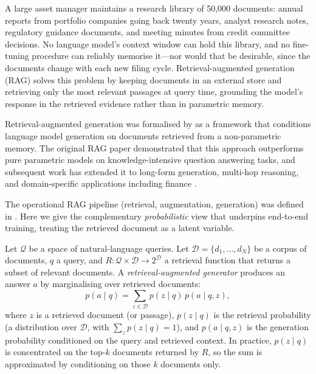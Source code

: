 \begin{context}
A large asset manager maintains a research library of 50,000 documents: annual reports
from portfolio companies going back twenty years, analyst research notes, regulatory
guidance documents, and meeting minutes from credit committee decisions. No language
model's context window can hold this library, and no fine-tuning procedure can reliably
memorise it---nor would that be desirable, since the documents change with each new
filing cycle. Retrieval-augmented generation (RAG) solves this problem by keeping
documents in an external store and retrieving only the most relevant passages at query
time, grounding the model's response in the retrieved evidence rather than in
parametric memory.
\end{context}

\begin{deepdive}

Retrieval-augmented generation was formalised by \citet{lewis2020rag} as a
framework that conditions language model generation on documents retrieved from a
non-parametric memory. The original RAG paper demonstrated that this approach
outperforms pure parametric models on knowledge-intensive question answering tasks,
and subsequent work has extended it to long-form generation, multi-hop reasoning, and
domain-specific applications including finance \cite{gao2024retrieval}.

The operational RAG pipeline (retrieval, augmentation, generation) was defined in
. Here we give the complementary \emph{probabilistic} view that
underpins end-to-end training, treating the retrieved document as a latent variable.

\begin{definition}
\label{def:rag-marginal}
Let $\mathcal{Q}$ be a space of natural-language queries.
Let $\mathcal{D} = \{d_1, \ldots, d_N\}$ be a corpus of documents, $q$ a query, and
$R: \mathcal{Q} \times \mathcal{D} \to 2^{\mathcal{D}}$ a retrieval function that
returns a subset of relevant documents. A \emph{retrieval-augmented generator} produces
an answer $a$ by marginalising over retrieved documents:
\begin{equation}
  p(a \mid q) = \sum_{z \in \mathcal{D}} p(z \mid q)\, p(a \mid q, z),
  \label{eq:rag-marginal}
\end{equation}
where $z$ is a retrieved document (or passage), $p(z \mid q)$ is the retrieval
probability (a distribution over $\mathcal{D}$, with $\sum_{z} p(z \mid q) = 1$),
and $p(a \mid q, z)$ is the generation probability conditioned on the
query and retrieved context. In practice, $p(z \mid q)$ is concentrated on the top-$k$
documents returned by $R$, so the sum is approximated by conditioning on those $k$
documents only.
\end{definition}


\end{deepdive}
